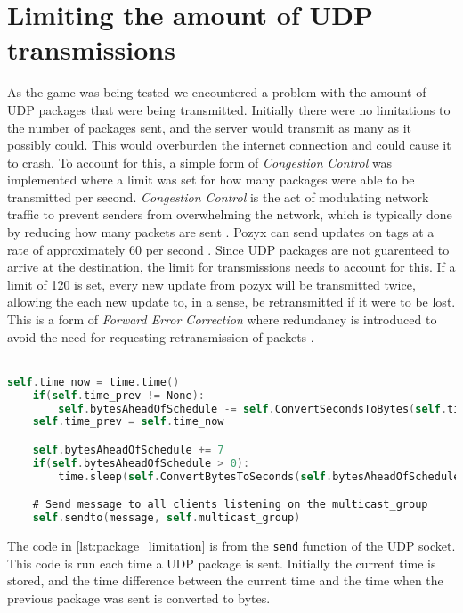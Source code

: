 \section{Limiting the amount of UDP transmissions}
As the game was being tested we encountered a problem with the amount of UDP packages that were being transmitted.
Initially there were no limitations to the number of packages sent, and the server would transmit as many as it possibly could.
This would overburden the internet connection and could cause it to crash.
To account for this, a simple form of \textit{Congestion Control} was implemented where a limit was set for how many packages were able to be transmitted per second.
\textit{Congestion Control} is the act of modulating network traffic to prevent senders from overwhelming the network, which is typically done by reducing how many packets are sent \cite{CongestionControl}.
Pozyx can send updates on tags at a rate of approximately 60 per second \cite{pozyx-Performance}.
Since UDP packages are not guarenteed to arrive at the destination, the limit for transmissions needs to account for this.
If a limit of 120 is set, every new update from pozyx will be transmitted twice, allowing the each new update to, in a sense, be retransmitted if it were to be lost.
This is a form of \textit{Forward Error Correction} where redundancy is introduced to avoid the need for requesting retransmission of packets \cite{FEC}.
\\\\
\begin{lstlisting}[caption={Implementaion of the limit on the amount of packages that can be sent per second}, captionpos=b,language=C,label={lst:package_limitation}]
    self.time_now = time.time()
    if(self.time_prev != None):
        self.bytesAheadOfSchedule -= self.ConvertSecondsToBytes(self.time_now - self.time_prev)
    self.time_prev = self.time_now

    self.bytesAheadOfSchedule += 7
    if(self.bytesAheadOfSchedule > 0):
        time.sleep(self.ConvertBytesToSeconds(self.bytesAheadOfSchedule))

    # Send message to all clients listening on the multicast_group
    self.sendto(message, self.multicast_group)
\end{lstlisting}
The code in \autoref{lst:package_limitation} is from the \texttt{send} function of the UDP socket.
This code is run each time a UDP package is sent.
Initially the current time is stored, and the time difference between the current time and the time when the previous package was sent is converted to bytes.
